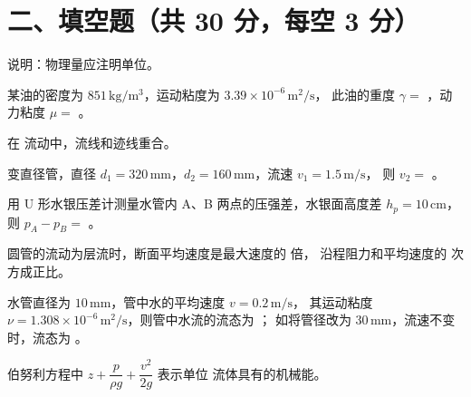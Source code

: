 \section{二、填空题（共 30 分，每空 3 分）}

\noindent 说明：物理量应注明单位。

\begin{ti}
  \item 某油的密度为 $851\,\mathrm{kg/m^3}$，运动粘度为 $3.39\times10^{-6}\,\mathrm{m^2/s}$，
  此油的重度 $\gamma=$ \underline{\hspace{2.2cm}}，动力粘度 $\mu=$ \underline{\hspace{2.2cm}}。
  \hfill{}

  \item 在 \underline{\hspace{3cm}} 流动中，流线和迹线重合。\hfill{}

  \item 变直径管，直径 $d_1=320\,\mathrm{mm}$，$d_2=160\,\mathrm{mm}$，流速 $v_1=1.5\,\mathrm{m/s}$，
  则 $v_2=$ \underline{\hspace{2.5cm}}。\hfill{}

  \item 用 U 形水银压差计测量水管内 A、B 两点的压强差，水银面高度差 $h_p=10\,\mathrm{cm}$，
  则 $p_A-p_B=$ \underline{\hspace{3cm}}。\hfill{}

  \item 圆管的流动为层流时，断面平均速度是最大速度的 \underline{\hspace{2.5cm}} 倍，
  沿程阻力和平均速度的 \underline{\hspace{2cm}} 次方成正比。\hfill{}

  \item 水管直径为 $10\,\mathrm{mm}$，管中水的平均速度 $v=0.2\,\mathrm{m/s}$，
  其运动粘度 $\nu=1.308\times10^{-6}\,\mathrm{m^2/s}$，则管中水流的流态为 \underline{\hspace{2.5cm}}；
  如将管径改为 $30\,\mathrm{mm}$，流速不变时，流态为 \underline{\hspace{2.5cm}}。
  \hfill{}

  \item 伯努利方程中 $z+\dfrac{p}{\rho g}+\dfrac{v^{2}}{2g}$ 表示单位 \underline{\hspace{2.5cm}}
  流体具有的机械能。\hfill{}
\end{ti}

